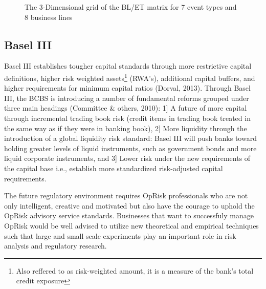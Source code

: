 \documentclass{DissertateUSU}
\begin{document}
\begin{figure}
\caption{The 3-Dimensional grid of the BL/ET matrix for 7 event types and 8 business lines}
\end{figure}

\subsection{Basel III}

Basel III establishes tougher capital standards through more restrictive
capital definitions, higher risk weighted
assets\footnote{Also reffered to as risk-weighted amount, it is a measure of the bank's total credit exposure}
(RWA's), additional capital buffers, and higher requirements for minimum
capital ratios (Dorval, 2013). Through Basel III, the BCBS is
introducing a number of fundamental reforms grouped under three main
headings (Committee \& others, 2010): 1{]} A future of more capital
through incremental trading book risk (credit items in trading book
treated in the same way as if they were in banking book), 2{]} More
liquidity through the introduction of a global liquidity risk standard:
Basel III will push banks toward holding greater levels of liquid
instruments, such as government bonds and more liquid corporate
instruments, and 3{]} Lower risk under the new requirements of the
capital base i.e., establish more standardized risk-adjusted capital
requirements.\medskip

The future regulatory environment requires OpRisk professionals who are
not only intelligent, creative and motivated but also have the courage
to uphold the OpRisk advisory service standards. Businesses that want to
successfuly manage OpRisk would be well advised to utilize new
theoretical and empirical techniques such that large and small scale
experiments play an important role in risk analysis and regulatory
research.
\end{document}
